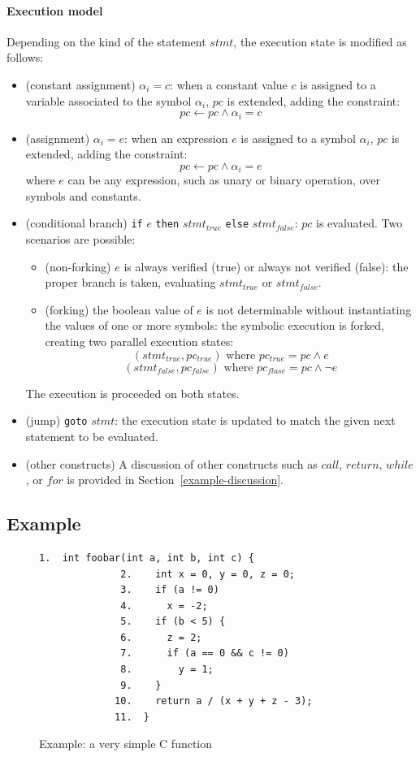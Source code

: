 \paragraph{Execution model} Depending on the kind of the statement $stmt$, the execution state is modified as follows:
\begin{itemize}
  \item (constant assignment) $\alpha_i = c$: when a constant value $c$ is assigned to a variable associated to the symbol $\alpha_i$, $pc$ is extended, adding the constraint:
    \[ pc \gets pc \wedge \alpha_i = c\]
  \item (assignment) $\alpha_i = e$: when an expression $e$ is assigned to a symbol $\alpha_i$, $pc$ is extended, adding the constraint:
    \[ pc \gets pc \wedge \alpha_i = e\]
  where $e$ can be any expression, such as unary or binary operation, over symbols and constants.
  \item (conditional branch) {\tt if} $e$ {\tt then} $stmt_{true}$ {\tt else} $stmt_{false}$: $pc$ is evaluated. Two scenarios are possible:
    \begin{itemize}
      \item (non-forking) $e$ is always verified (true) or always not verified (false): the proper branch is taken, evaluating $stmt_{true}$ or $stmt_{false}$.
      \item (forking) the boolean value of $e$ is not determinable without instantiating the values of one or more symbols: the symbolic execution is forked, creating two parallel execution states:
        \[ (stmt_{true}, pc_{true}) \text{ where } pc_{true} = pc \wedge e \]
        \[ (stmt_{false}, pc_{false}) \text{ where } pc_{flase} = pc \wedge \neg e \]
    \end{itemize}
    The execution is proceeded on both states.
  \item (jump) {\tt goto} $stmt$: the execution state is updated to match the given next statement to be evaluated. 
  \item (other constructs) A discussion of other constructs such as $call$, $return$, $while$, or $for$ is provided in Section~\ref{example-discussion}. 
\end{itemize}

\subsection{Example}
\label{symbolic-execution-example}

\begin{figure}[t]
\begin{lstlisting}[basicstyle=\ttfamily\small]
              1.  int foobar(int a, int b, int c) {
              2.    int x = 0, y = 0, z = 0;
              3.    if (a != 0)
              4.      x = -2;
              5.    if (b < 5) {
              6.      z = 2;
              7.      if (a == 0 && c != 0)
              8.        y = 1;
              9.    }
             10.    return a / (x + y + z - 3);
             11.  }
\end{lstlisting}
\label{fig:example-1}
\caption{Example: a very simple C function}
\end{figure}


